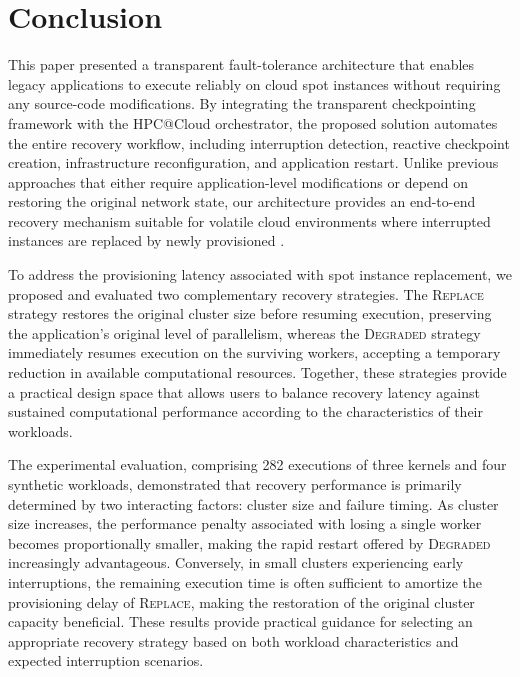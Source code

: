\documentclass[conference]{IEEEtran}
\begin{document}
\section{Conclusion}
\label{sec:conclusion}

This paper presented a transparent fault-tolerance architecture that enables legacy \MPI applications to execute reliably on cloud spot instances without requiring any source-code modifications. By integrating the \MANA transparent checkpointing framework with the HPC@Cloud orchestrator, the proposed solution automates the entire recovery workflow, including interruption detection, reactive checkpoint creation, infrastructure reconfiguration, and application restart. Unlike previous approaches that either require application-level modifications or depend on restoring the original network state, our architecture provides an end-to-end recovery mechanism suitable for volatile cloud environments where interrupted instances are replaced by newly provisioned \VMs.

To address the provisioning latency associated with spot instance replacement, we proposed and evaluated two complementary recovery strategies. The \textsc{Replace} strategy restores the original cluster size before resuming execution, preserving the application's original level of parallelism, whereas the \textsc{Degraded} strategy immediately resumes execution on the surviving workers, accepting a temporary reduction in available computational resources. Together, these strategies provide a practical design space that allows users to balance recovery latency against sustained computational performance according to the characteristics of their workloads.

The experimental evaluation, comprising 282 executions of three \NPB kernels and four synthetic workloads, demonstrated that recovery performance is primarily determined by two interacting factors: cluster size and failure timing. As cluster size increases, the performance penalty associated with losing a single worker becomes proportionally smaller, making the rapid restart offered by \textsc{Degraded} increasingly advantageous. Conversely, in small clusters experiencing early interruptions, the remaining execution time is often sufficient to amortize the provisioning delay of \textsc{Replace}, making the restoration of the original cluster capacity beneficial. These results provide practical guidance for selecting an appropriate recovery strategy based on both workload characteristics and expected interruption scenarios.
\end{document}
